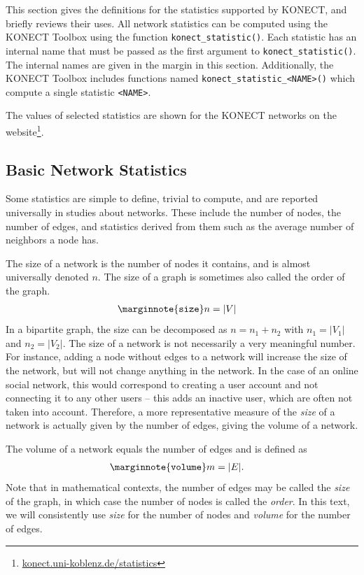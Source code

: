\documentclass{article}
\begin{document}
This section gives the definitions for the statistics supported by
KONECT, and briefly reviews their uses.  
All network statistics can be computed using the KONECT Toolbox using
the function \texttt{konect\_statistic()}. Each statistic has an
internal name that must be passed as the first argument to
\texttt{konect\_statistic()}.  The internal names are given in the
margin in this section. 
Additionally, the KONECT Toolbox includes functions named
\texttt{konect\_statistic\_<NAME>()} which compute a single statistic
\texttt{<NAME>}. 

The values of selected statistics are
shown for the KONECT networks on the
website\footnote{\href{http://konect.uni-koblenz.de/statistics/}{konect.uni-koblenz.de/statistics}}.  

\subsection{Basic Network Statistics}
Some statistics are simple to define, trivial to compute, and 
are reported universally in studies about networks.  These include the
number of nodes, the number of edges, and statistics derived from them
such as the average number of neighbors a node has.  

The size of a network is the number of nodes it contains, and
is almost universally denoted $n$.  The size of a graph is sometimes also
called the order of the graph. 
\begin{align}
  \marginnote{\texttt{size}}
  n &= |V|
\end{align}
In a bipartite graph, the size can be decomposed as $n = n_1 + n_2$ with
$n_1 = |V_1|$ and $n_2=|V_2|$.  The size of a network is not necessarily
a very meaningful number.  For instance, adding a node without edges to
a network will increase the size of the network, but will not change
anything in the network. In the case of an online social
network, this would correspond to creating a user account and not
connecting it to any other users -- this adds an inactive user, which
are often not taken into account.  Therefore, a more representative
measure of the \emph{size} of a network is actually given by the number
of edges, giving the volume of a network.

The volume of a network equals the number of edges and is defined as 
\begin{align}
  \marginnote{\texttt{volume}}
  m &= |E|. 
\end{align}
Note that in mathematical contexts, the number of edges may be called
the \emph{size} of the graph, in which case the number of nodes is
called the \emph{order}.  In this text, we will consistently use
\emph{size} for the number of nodes and \emph{volume} for the number of
edges. 
\end{document}
